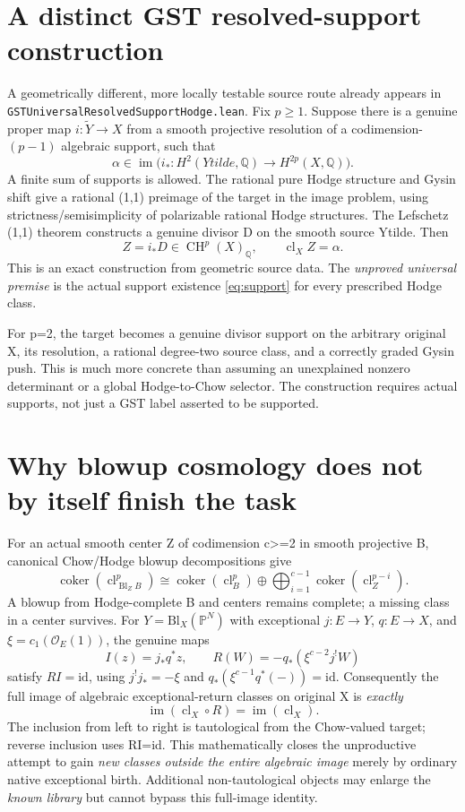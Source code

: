 \documentclass[11pt,a4paper]{article}
\newcommand{\Q}{\mathbb Q}
\newcommand{\CH}{\operatorname{CH}}
\newcommand{\cl}{\operatorname{cl}}
\newcommand{\im}{\operatorname{im}}
\newcommand{\coker}{\operatorname{coker}}
\begin{document}
\section{A distinct GST resolved-support construction}
A geometrically different, more locally testable
source route already appears in
\texttt{GSTUniversalResolvedSupportHodge.lean}.
Fix \(p\ge1\). Suppose there is a genuine proper map
\(i:\widetilde Y\to X\) from a smooth projective resolution of
a codimension-\((p-1)\) algebraic support, such that
\[
 \alpha\in\im\bigl(
 i_*:H^2(Ytilde,\Q)\longrightarrow H^{2p}(X,\Q)\bigr).
 \tag{7.1}\label{eq:support}
\]
A finite sum of supports is allowed.
The rational pure Hodge structure and Gysin shift
give a rational (1,1) preimage of the target in
the image problem, using strictness/semisimplicity
of polarizable rational Hodge structures.
The Lefschetz (1,1) theorem constructs a genuine
divisor D on the smooth source Ytilde.  Then
\[
                    Z=i_*D\in\CH^p(X)_\Q,
                    \qquad\cl_XZ=\alpha. \tag{7.2}
\]
This is an exact construction from geometric source
data.  The \emph{unproved universal premise} is
the actual support existence \eqref{eq:support}
for every prescribed Hodge class.

For p=2, the target becomes a genuine divisor
support on the arbitrary original X, its resolution,
a rational degree-two source class, and a correctly
graded Gysin push.  This is much more concrete than
assuming an unexplained nonzero determinant or a
global Hodge-to-Chow selector.  The construction
requires actual supports, not just a GST label
asserted to be supported.

\section{Why blowup cosmology does not by itself finish the task}
For an actual smooth center Z of codimension c>=2
in smooth projective B, canonical Chow/Hodge
blowup decompositions give
\[
 \coker(\cl_{\operatorname{Bl}_ZB}^p)
 \cong\coker(\cl_B^p)\oplus
 \bigoplus_{i=1}^{c-1}\coker(\cl_Z^{p-i}).
 \tag{8.1}
\]
A blowup from Hodge-complete B and centers remains
complete; a missing class in a center survives.
For \(Y=\mathrm{Bl}_X(\mathbb P^N)\) with exceptional \(j:E\to Y\),
\(q:E\to X\), and \(\xi=c_1(\mathcal O_E(1))\), the genuine maps
\[
 I(z)=j_*q^*z,\qquad
 R(W)=-q_*(\xi^{c-2}j^!W) \tag{8.2}
\]
satisfy \(RI=\mathrm{id}\), using \(j^!j_*=-\xi\) and
\(q_*(\xi^{c-1}q^*(-))=\mathrm{id}\).
Consequently the full image of algebraic
exceptional-return classes on original X is
\emph{exactly}
\[
             \im(\cl_X\circ R)=\im(\cl_X).
             \tag{8.3}
\]
The inclusion from left to right is tautological
from the Chow-valued target; reverse inclusion
uses RI=id.  This mathematically closes the
unproductive attempt to gain \emph{new classes
outside the entire algebraic image} merely by
ordinary native exceptional birth.  Additional
non-tautological objects may enlarge the \emph{known
library} but cannot bypass this full-image identity.
\end{document}
